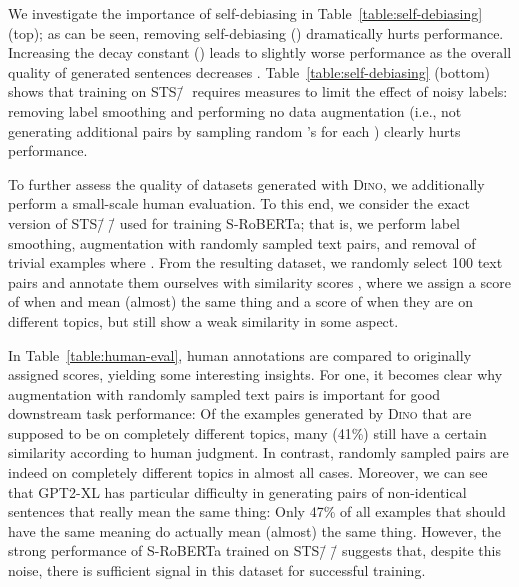 \documentclass[11pt]{article}
\newcommand\ours{\textsc{Dino}}
\newcommand\ourDs{STS\=/🦕}
\newcommand\ourDsSemi{STS\=/🦕\=/}
\begin{document}
We investigate the importance of self-debiasing \citep{schick2021selfdiagnosis} in Table~\ref{table:self-debiasing} (top); as can be seen, removing self-debiasing () dramatically hurts performance.
Increasing the decay constant () leads to slightly worse performance as the overall quality of generated sentences decreases \citep{schick2021selfdiagnosis}.
Table~\ref{table:self-debiasing} (bottom) shows that training on \ourDs{} requires measures to limit the effect of noisy labels: removing label smoothing and performing no data augmentation (i.e., not generating additional pairs  by sampling random 's for each ) clearly hurts performance. 

To further assess the quality of datasets generated with \ours{}, we additionally perform a small-scale human evaluation. To this end, we consider the exact version of \ourDsSemi{} used for training S-RoBERTa; that is, we perform label smoothing, augmentation with randomly sampled text pairs, and removal of trivial examples where . From the resulting dataset, we randomly select 100 text pairs  and annotate them ourselves with similarity scores , where we assign a score of  when  and  mean (almost) the same thing and a score of  when they are on different topics, but still show a weak similarity in some aspect.

In Table~\ref{table:human-eval}, human annotations are compared to originally assigned scores, yielding some interesting insights. For one, it becomes clear why augmentation with randomly sampled text pairs is important for good downstream task performance: Of the examples generated by \ours{} that are supposed to be on completely different topics, many (41\%) still have a certain similarity according to human judgment. In contrast, randomly sampled pairs are indeed on completely different topics in almost all cases. Moreover, we can see that GPT2-XL has particular difficulty in generating pairs of non-identical sentences that really mean the same thing: Only 47\% of all examples that should have the same meaning do actually mean (almost) the same thing. However, the strong performance of S-RoBERTa trained on \ourDsSemi{} suggests that, despite this noise, there is sufficient signal in this dataset for successful training.
\end{document}
